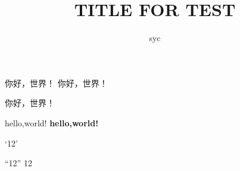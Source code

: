 \documentclass[a4paper, 12pt, fontset=windows, draft]{ctexbook}
\title{TITLE FOR TEST}
\author{syc}
\begin{document}

\maketitle

你好，世界！
你好，世界！
\clearpage

你好，世界！

hello,world!
\bf
hello,world!

`12'

``12''
12
\end{document}
